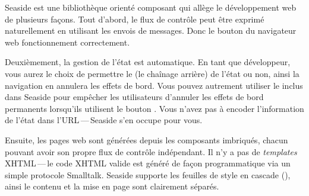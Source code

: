 \documentclass[a4paper,10pt,twoside]{book}
\begin{document}

Seaside est une bibliothèque orienté composant
qui allège le développement web de plusieurs façons.
Tout d'abord, le flux de contrôle
peut être exprimé naturellement en utilisant les envois de messages.
Donc le bouton \backbtn du navigateur web fonctionnement correctement.

Deuxièmement, la gestion de l'état est automatique. %
En tant que développeur, vous aurez le choix de permettre le
\backtracking (\ie le chaînage arrière) de l'état ou non, ainsi la
navigation en \backbtn{} annulera les effets de bord.
Vous pouvez autrement utiliser le 
inclus dans Seaside pour empêcher les utilisateurs d'annuler les
effets de bord permanents lorsqu'ils utilisent le bouton \backbtn.
Vous n'avez pas à encoder l'information de l'état dans
l'URL\,---\,Seaside s'en occupe pour vous. 

Ensuite, les pages web sont générées depuis les composants imbriqués,
chacun pouvant avoir son propre flux de contrôle indépendant.
Il n'y a pas de \emph{templates} XHTML\,---\,le code XHTML valide est
généré de façon programmatique via un simple protocole Smalltalk.
Seaside supporte les feuilles de style en cascade 
 (), ainsi le contenu et la mise en page sont clairement
 séparés.
\end{document}
